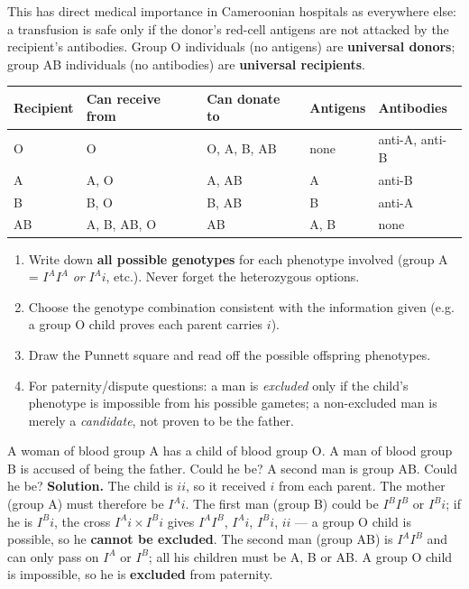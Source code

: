 \documentclass[11pt]{article}
\begin{document}
This has direct medical importance in Cameroonian hospitals as everywhere else: a transfusion is safe only if the donor's red-cell antigens are not attacked by the recipient's antibodies. Group O individuals (no antigens) are \textbf{universal donors}; group AB individuals (no antibodies) are \textbf{universal recipients}.

\begin{center}
\begin{tabularx}{\linewidth}{|l|X|X|X|X|}
\hline
\rowcolor{popblueL} \textbf{Recipient} & \textbf{Can receive from} & \textbf{Can donate to} & \textbf{Antigens} & \textbf{Antibodies} \\
\hline
O & O & O, A, B, AB & none & anti-A, anti-B \\
\hline
A & A, O & A, AB & A & anti-B \\
\hline
B & B, O & B, AB & B & anti-A \\
\hline
AB & A, B, AB, O & AB & A, B & none \\
\hline
\end{tabularx}
\end{center}

\begin{methode}
\begin{enumerate}
\item Write down \textbf{all possible genotypes} for each phenotype involved (group A = $I^A I^A$ \emph{or} $I^A i$, etc.). Never forget the heterozygous options.
\item Choose the genotype combination consistent with the information given (e.g. a group O child proves each parent carries $i$).
\item Draw the Punnett square and read off the possible offspring phenotypes.
\item For paternity/dispute questions: a man is \emph{excluded} only if the child's phenotype is impossible from his possible gametes; a non-excluded man is merely a \emph{candidate}, not proven to be the father.
\end{enumerate}
\end{methode}

\begin{exoresolu}
A woman of blood group A has a child of blood group O. A man of blood group B is accused of being the father. Could he be? A second man is group AB. Could he be?
\tcblower
\textbf{Solution.} The child is $ii$, so it received $i$ from each parent. The mother (group A) must therefore be $I^A i$. The first man (group B) could be $I^B I^B$ or $I^B i$; if he is $I^B i$, the cross $I^A i \times I^B i$ gives $I^A I^B$, $I^A i$, $I^B i$, $ii$ — a group O child is possible, so he \textbf{cannot be excluded}. The second man (group AB) is $I^A I^B$ and can only pass on $I^A$ or $I^B$; all his children must be A, B or AB. A group O child is impossible, so he is \textbf{excluded} from paternity.
\end{exoresolu}
\end{document}
